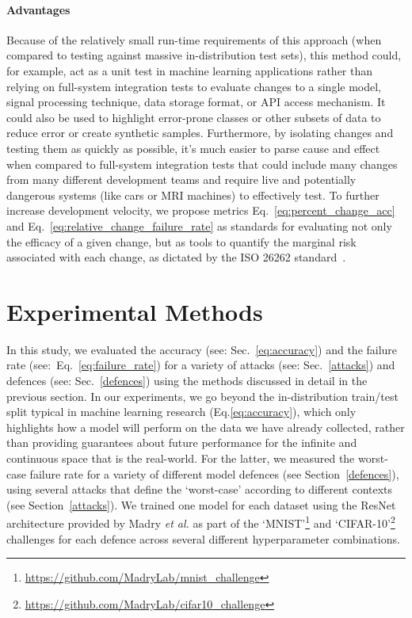 \documentclass[journal]{IEEEtran}
\begin{document}
\paragraph{Advantages}
Because of the relatively small run-time requirements of this approach (when compared to testing against massive in-distribution test sets), this method could, for example, act as a unit test in machine learning applications rather than relying on full-system integration tests to evaluate changes to a single model, signal processing technique, data storage format, or API access mechanism.
It could also be used to highlight error-prone classes or other subsets of data to reduce error or create synthetic samples.
Furthermore, by isolating changes and testing them as quickly as possible, it's much easier to parse cause and effect when compared to full-system integration tests that could include many changes from many different development teams and require live and potentially dangerous systems (like cars or MRI machines) to effectively test.
To further increase development velocity, we propose metrics Eq.~\ref{eq:percent_change_acc} and Eq.~\ref{eq:relative_change_failure_rate} as standards for evaluating not only the efficacy of a given change, but as tools to quantify the marginal risk associated with each change, as dictated by the ISO 26262 standard~\cite{iso26262}.

\section{Experimental Methods}

\label{methods}
In this study, we evaluated the accuracy (see: Sec.~\ref{eq:accuracy}) and the failure rate (see:~Eq.~\ref{eq:failure_rate}) for a variety of attacks (see: Sec.~\ref{attacks}) and defences (see: Sec.~\ref{defences}) using the methods discussed in detail in the previous section.
In our experiments, we go beyond the in-distribution train/test split typical in machine learning research (Eq.\ref{eq:accuracy}), which only highlights how a model will perform on the data we have already collected, rather than providing guarantees about future performance for the infinite and continuous space that is the real-world.
For the latter, we measured the worst-case failure rate for a variety of different model defences (see Section~\ref{defences}), using several attacks that define the ‘worst-case’ according to different contexts (see Section~\ref{attacks}).
We trained one model for each dataset using the ResNet~\cite{resnet} architecture provided by Madry \textit{et al.}
as part of the `MNIST'\footnote{\href{https://github.com/MadryLab/mnist_challenge}{https://github.com/MadryLab/mnist\_challenge}} and `CIFAR-10'\footnote{\href{https://github.com/MadryLab/cifar10_challenge}{https://github.com/MadryLab/cifar10\_challenge}} challenges for each defence across several different hyperparameter combinations.
\end{document}
